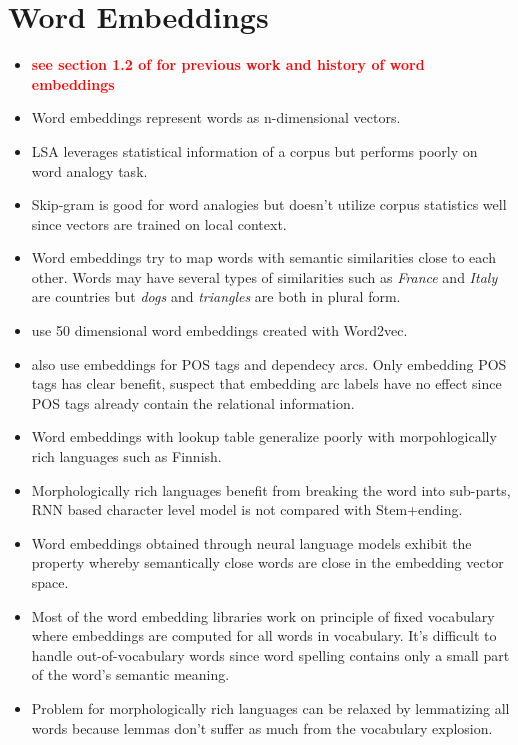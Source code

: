 \documentclass[12pt,a4paper,english
]{tutthesis}
\begin{document}
\section{Word Embeddings}
\label{se:word_embeddings}
\begin{itemize}
\item \textbf{\textcolor{red}{see section 1.2 of \cite{Mikolov2013} for previous work and history of word embeddings}}
\item Word embeddings represent words as n-dimensional vectors. \cite{Mikolov2013}
\item LSA leverages statistical information of a corpus but performs poorly on word analogy task. \cite{Pennington2014}
\item Skip-gram is good for word analogies but doesn't utilize corpus statistics well since vectors are trained on local context. \cite{Pennington2014}
\item Word embeddings try to map words with semantic similarities close to each other. Words may have several types of similarities such as \textit{France} and \textit{Italy} are countries but \textit{dogs} and \textit{triangles} are both in plural form. \cite{Mikolov2013a}
\item \cite{Chen2014} use 50 dimensional word embeddings created with Word2vec.
\item \cite{Chen2014} also use embeddings for POS tags and dependecy arcs. Only embedding POS tags has clear benefit, \cite{Chen2014} suspect that embedding arc labels have no effect since POS tags already contain the relational information.
\item Word embeddings with lookup table generalize poorly with morpohlogically rich languages such as Finnish. \cite{Takala2016}
\item Morphologically rich languages benefit from breaking the word into sub-parts, RNN based character level model is not compared with Stem+ending. \cite{Takala2016}
\item Word embeddings obtained through neural language models exhibit the property whereby semantically close words are close in the embedding vector space. \cite{Kim2016}
\item Most of the word embedding libraries work on principle of fixed vocabulary where embeddings are computed for all words in vocabulary. It's difficult to handle out-of-vocabulary words since word spelling contains only a small part of the word's semantic meaning.
\item Problem for morphologically rich languages can be relaxed by lemmatizing all words because lemmas don't suffer as much from the vocabulary explosion.
\end{itemize}
\end{document}
